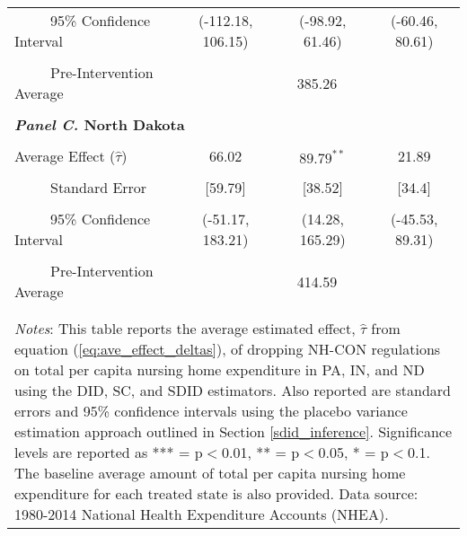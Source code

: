 \documentclass[../Main.tex]{subfiles}
\begin{document}
\begin{table}[htbp]
\begin{tabular}{l*{3}{c}}
\multicolumn{1}{l}{\ \ \ \ \ 95\% Confidence Interval}&   \multicolumn{1}{c}{(-112.18, 106.15)}&   \multicolumn{1}{c}{(-98.92, 61.46)}&   \multicolumn{1}{c}{(-60.46, 80.61)}\\
\\[-2ex]
\multicolumn{1}{l}{\ \ \ \ \ Pre-Intervention Average}&   \multicolumn{3}{c}{385.26}\\
\\[-.1ex]
\multicolumn{4}{l}{\textbf{\textit{Panel C.} North Dakota}}\\
\\[-1.5ex]
\multicolumn{1}{l}{Average Effect ($\hat{\tau}$)}&   \multicolumn{1}{c}{66.02}&   \multicolumn{1}{c}{$89.79^{**}$}&  \multicolumn{1}{c}{21.89}\\
\\[-2ex]
\multicolumn{1}{l}{\ \ \ \ \ Standard Error}  &\multicolumn{1}{c}{[59.79]}&\multicolumn{1}{c}{[38.52]}&\multicolumn{1}{c}{[34.4]}\\
\\[-2ex]
\multicolumn{1}{l}{\ \ \ \ \ 95\% Confidence Interval}&   \multicolumn{1}{c}{(-51.17, 183.21)}&   \multicolumn{1}{c}{(14.28, 165.29)}&   \multicolumn{1}{c}{(-45.53, 89.31)}\\
\\[-2ex]
\multicolumn{1}{l}{\ \ \ \ \ Pre-Intervention Average}&   \multicolumn{3}{c}{414.59}\\
\\[-.1ex]
\hline\hline
\\[-2ex]
\multicolumn{4}{p{.78\linewidth}}{\footnotesize \textit{Notes}: This table reports the average estimated effect, $\hat{\tau}$ from equation (\ref{eq:ave_effect_deltas}), of dropping NH-CON regulations on total per capita nursing home expenditure in PA, IN, and ND using the DID, SC, and SDID estimators. Also reported are standard errors and 95\% confidence intervals using the placebo variance estimation approach outlined in Section \ref{sdid_inference}. Significance levels are reported as *** = p$<$0.01, ** = p$<$0.05, * = p$<$0.1. The baseline average amount of total per capita nursing home expenditure for each treated state is also provided. Data source: 1980-2014 National Health Expenditure Accounts (NHEA).}
\end{tabular}
\end{table}
\vfill
\clearpage
\end{document}
